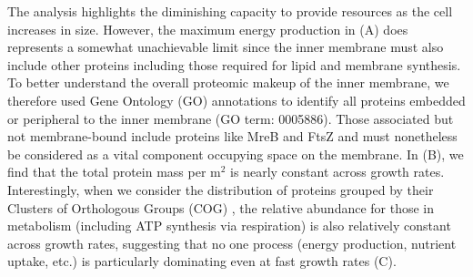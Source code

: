 The analysis highlights the diminishing capacity to provide resources as the
cell increases in size. However, the maximum energy production in
(A) does represents a somewhat unachievable limit since
the inner membrane must also include other proteins including those required
for lipid and membrane synthesis. To better
understand the overall proteomic makeup of the inner membrane, we therefore
used Gene Ontology (GO) annotations \citep{ashburner2000,
thegeneOntologyconsortium2018} to identify all proteins embedded or
peripheral to the inner membrane (GO term: 0005886). Those associated but not
membrane-bound include proteins like MreB and FtsZ
and must nonetheless be considered as a vital
component occupying space on the membrane. In (B), we
find that the total protein mass per \textmu m$^2$ is nearly constant across
growth rates. Interestingly, when we consider the distribution of proteins
grouped by their Clusters of Orthologous Groups (COG) \citep{tatusov2000},
the relative abundance for those in metabolism (including ATP synthesis via
respiration) is also relatively constant across growth rates, suggesting that
no one process (energy production, nutrient uptake, etc.) is particularly
dominating even at fast growth rates (C).

